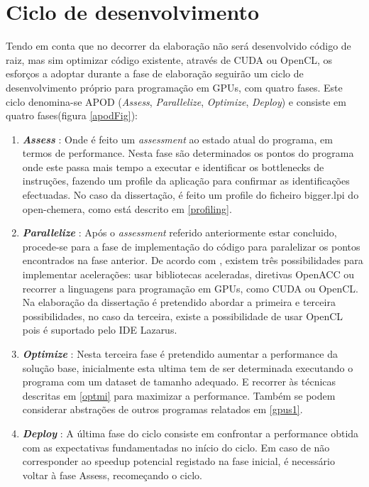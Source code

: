 \section{Ciclo de desenvolvimento}
Tendo em conta que no decorrer da elaboração não será desenvolvido código de raiz, mas sim optimizar código existente, através de CUDA ou OpenCL, os esforços a adoptar durante a fase de elaboração seguirão um ciclo de desenvolvimento próprio para programação em GPUs, com quatro fases. Este ciclo denomina-se APOD (\textit{Assess}, \textit{Parallelize}, \textit{Optimize}, \textit{Deploy}) \cite{cudaProgGuide} e consiste em quatro fases(figura \ref{apodFig}):
\begin{enumerate}
\item {\textbf{\textit{Assess}}} : Onde é feito um \textit{assessment} ao estado atual do programa, em termos de performance. Nesta fase são determinados os pontos do programa onde este passa mais tempo a executar e identificar os bottlenecks de instruções, fazendo um profile da aplicação para confirmar as  identificações efectuadas. No caso da dissertação, é feito um profile do ficheiro bigger.lpi do open-chemera, como está descrito em \ref{profiling}. 


\item{\textbf{\textit{ Parallelize}}} : Após o \textit{assessment}  referido anteriormente estar concluido, procede-se para a fase de implementação do código para paralelizar os pontos encontrados na fase anterior. De acordo com \cite{saxpy}, existem três possibilidades para implementar acelerações: usar bibliotecas aceleradas, diretivas OpenACC ou recorrer a linguagens para programação em GPUs, como CUDA ou OpenCL. Na elaboração da dissertação é pretendido abordar a primeira e terceira possibilidades, no caso da terceira, existe a possibilidade de usar OpenCL pois é suportado pelo IDE Lazarus.

\item{\textbf{\textit{Optimize}}} : Nesta terceira fase é pretendido aumentar a performance da solução base, inicialmente esta ultima tem de ser determinada executando o programa com um dataset de tamanho adequado. E recorrer às técnicas descritas em \ref{optmi} para maximizar a performance. Também se podem considerar abstrações de outros programas relatados em \ref{gpus1}.

\item{\textbf{\textit{Deploy}}} : A última fase do ciclo consiste em confrontar a performance obtida com as expectativas fundamentadas no início do ciclo. Em caso de não corresponder ao speedup potencial registado na fase inicial, é necessário voltar à fase Assess, recomeçando o ciclo.
\end{enumerate}


